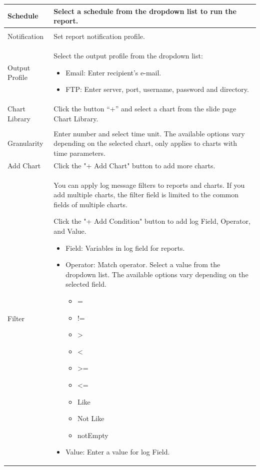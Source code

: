 \begin{description}
\begin{longtable}{p{}|p{}}
        Schedule & Select a schedule from the dropdown list to run the report.\\\hline
        \tabincell{l}{Enable\\ Notification} & Set report notification profile.\\\hline
        Output Profile & Select the output profile from the dropdown list:
                        \begin{itemize}
                            \item Email: Enter recipient's e-mail.
                            \item FTP: Enter server, port, username, password and directory.
                        \end{itemize} \\\hline 
        Chart Library & Click the button “+” and select a chart from the slide page Chart Library. \\\hline 
        \tabincell{l}{Time\\ Granularity} & Enter number and select time unit. The available options vary depending on the selected chart, only applies to charts with time parameters.\\\hline 
        Add Chart & Click the "+ Add Chart" button to add more charts.\\\hline 
        Filter & You can apply log message filters to reports and charts. If you add multiple charts, the filter field is limited to the common fields of multiple charts.
                
        
                Click the "+ Add Condition" button to add log Field, Operator, and Value.
                \begin{itemize}
                    \item Field: Variables in log field for reports. 
                    \item Operator: Match operator. Select a value from the dropdown list. The available options vary depending on the selected field.  
                    \begin{itemize}  
                        \item =    \item !=    \item >    \item <     \item >=    \item <=   \item Like   \item Not Like    \item notEmpty 
                    \end{itemize}
                    \item Value: Enter a value for log Field. 
                \end{itemize} \\\hline
    \end{longtable}    
\end{description}

